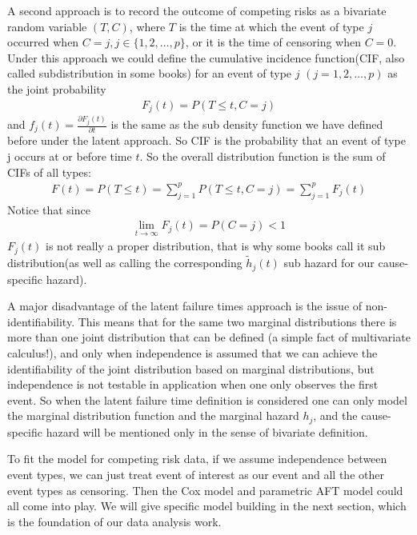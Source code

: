 \documentclass[times, doublespace]{simauth}
\begin{document}
A second approach is to record the outcome of competing risks as a bivariate random variable $(T, C)$, where $T$ is the time at which the event of type $j$ occurred when $C = j, j \in \{1, 2, \ldots, p\}$, or it is the time of censoring when $C = 0$. Under this approach we could define the cumulative incidence function(CIF, also called subdistribution in some books) for an event of type $j$ $(j = 1, 2, \ldots, p)$ as the joint probability
\begin{align*}
	F_j(t) = P(T \leq t, C = j)
\end{align*}
and $f_j(t) = \frac{\partial F_j(t)}{\partial t}$ is the same as the sub density function we have defined before under the latent approach. So CIF is the probability that an event of type j occurs at or before time $t$. So the overall distribution function is the sum of CIFs of all types:
\begin{align*}
	F(t) = P(T \leq t) = \sum_{j = 1}^{p}P(T \leq t, C = j) = \sum_{j = 1}^pF_j(t)
\end{align*}
Notice that since
\begin{align*}
	\lim_{t \to \infty}F_j(t) = P(C = j) < 1
\end{align*}
$F_j(t)$ is not really a proper distribution, that is why some books call it sub distribution(as well as calling the corresponding $\tilde{h}_j(t)$ sub hazard for our cause-specific hazard).

A major disadvantage of the latent failure times approach is the issue of non-identifiability\cite{pintilie06}. This means that for the same two marginal distributions there is more than one joint distribution that can be defined (a simple fact of multivariate calculus!), and only when independence is assumed that we can achieve the identifiability of the joint distribution based on marginal distributions, but independence is not testable in application when one only observes the first event. So when the latent failure time definition is considered one can only model the marginal distribution function and the marginal hazard $h_j$, and the cause-specific hazard will be mentioned only in the sense of bivariate definition.

To fit the model for competing risk data, if we assume independence between event types, we can just treat event of interest as our event and all the other event types as censoring. Then the Cox model and parametric AFT model could all come into play. We will give specific model building in the next section, which is the foundation of our data analysis work. 
\end{document}
